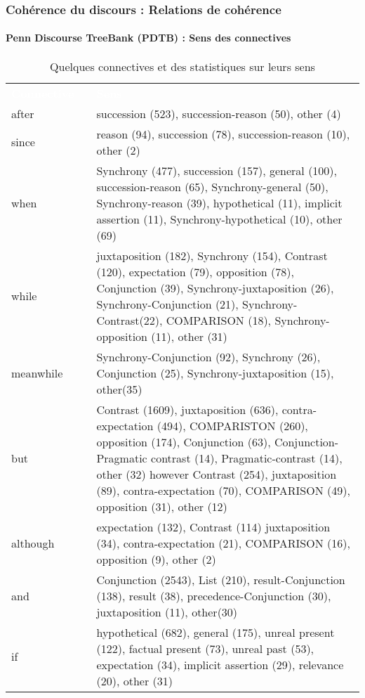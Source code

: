 \documentclass[xcolor=table]{beamer}
\begin{document}
\begin{frame}
	\frametitle{Cohérence du discours : Relations de cohérence}
	\framesubtitle{Penn Discourse TreeBank (PDTB) : Sens des connectives}
	
	\begin{table}
	\tiny\bfseries
	\begin{tabular}{p{}lp{}}
		\rowcolor{darkblue}
		\bfseries\textcolor{white}{Connective} && \bfseries\textcolor{white}{Sens}\\
		
		after && succession (523), succession-reason (50), other (4) \\
		since && reason (94), succession (78), succession-reason (10), other (2) \\
		when && Synchrony (477), succession (157), general (100), succession-reason (65), Synchrony-general (50),
		Synchrony-reason (39), hypothetical (11), implicit assertion (11), Synchrony-hypothetical (10), other
		(69) \\
		while && juxtaposition (182), Synchrony (154), Contrast (120), expectation (79), opposition (78), Conjunction
		(39), Synchrony-juxtaposition (26), Synchrony-Conjunction (21), Synchrony-Contrast(22), COMPARISON (18), Synchrony-opposition (11), other (31) \\
		meanwhile && Synchrony-Conjunction (92), Synchrony (26), Conjunction (25), Synchrony-juxtaposition (15),
		other(35)\\
		but && Contrast (1609), juxtaposition (636), contra-expectation (494), COMPARISTON (260), opposition
		(174), Conjunction (63), Conjunction-Pragmatic contrast (14), Pragmatic-contrast (14), other (32)
		however Contrast (254), juxtaposition (89), contra-expectation (70), COMPARISON (49), opposition (31),
		other (12)\\
		although && expectation (132), Contrast (114) juxtaposition (34), contra-expectation (21), COMPARISON (16),
		opposition (9), other (2)\\
		and && Conjunction (2543), List (210), result-Conjunction (138), result (38), precedence-Conjunction (30),
		juxtaposition (11), other(30)\\
		if && hypothetical (682), general (175), unreal present (122), factual present (73), unreal past (53), expectation (34), implicit assertion (29), relevance (20), other (31)\\
	\end{tabular}
	\caption{Quelques connectives et des statistiques sur leurs sens \cite{2008-prasad-al}}
	\end{table}
	
\end{frame}
\end{document}

